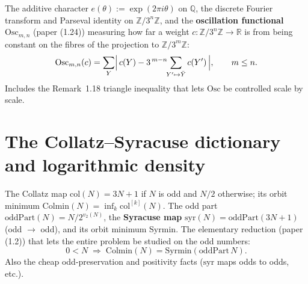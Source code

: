 \begin{definition}\label{S4}
  \leanok
The additive character \(e(\theta):=\exp(2\pi i\theta)\) on \(\mathbb{Q}\), the discrete
Fourier transform and Parseval identity on \(\mathbb{Z}/3^n\mathbb{Z}\), and the
\textbf{oscillation functional} \(\mathrm{Osc}_{m,n}\) (paper (1.24)) measuring how far a
weight \(c:\mathbb{Z}/3^n\mathbb{Z}\to\mathbb{R}\) is from being constant on the fibres of the
projection to \(\mathbb{Z}/3^m\mathbb{Z}\):
\[
  \mathrm{Osc}_{m,n}(c)=\sum_{Y}\Bigl|\,c(Y)-3^{\,m-n}\!\!\sum_{Y'\mapsto \bar Y} c(Y')\,\Bigr|,
  \qquad m\le n.
\]
Includes the Remark~1.18 triangle inequality that lets \(\mathrm{Osc}\) be controlled scale by
scale.
\end{definition}


\chapter{The Collatz--Syracuse dictionary and logarithmic density}\label{chp:dictionary}

\begin{definition}\label{C1}
  \leanok
The Collatz map \(\mathrm{col}(N)=3N+1\) if \(N\) is odd and \(N/2\) otherwise; its orbit
minimum \(\mathrm{Colmin}(N)=\inf_k \mathrm{col}^{[k]}(N)\).  The odd part
\(\mathrm{oddPart}(N)=N/2^{v_2(N)}\), the \textbf{Syracuse map}
\(\mathrm{syr}(N)=\mathrm{oddPart}(3N+1)\) (odd \(\to\) odd), and its orbit minimum
\(\mathrm{Syrmin}\).  The elementary reduction (paper (1.2)) that lets the entire problem be
studied on the odd numbers:
\[
  0<N \;\Longrightarrow\; \mathrm{Colmin}(N) = \mathrm{Syrmin}(\mathrm{oddPart}\,N).
\]
Also the cheap odd-preservation and positivity facts (\(\mathrm{syr}\) maps odds to odds, etc.).
\end{definition}

